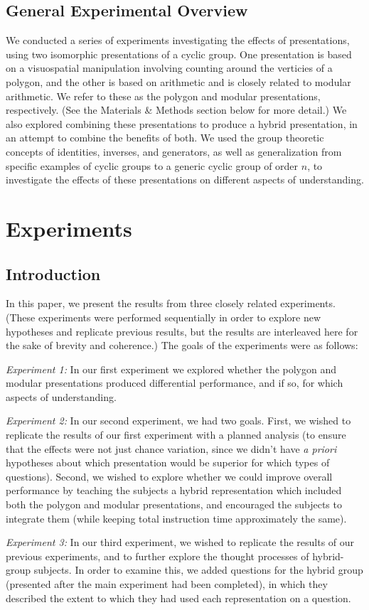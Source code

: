 \documentclass[man,10pt]{apa6}
\begin{document}
\subsection{General Experimental Overview}
We conducted a series of experiments investigating the effects of presentations, using two isomorphic presentations of a cyclic group. One presentation is based on a visuospatial manipulation involving counting around the verticies of a polygon, and the other is based on arithmetic and is closely related to modular arithmetic. We refer to these as the polygon and modular presentations, respectively. (See the Materials \& Methods section below for more detail.) We also explored combining these presentations to produce a hybrid presentation, in an attempt to combine the benefits of both. We used the group theoretic concepts of identities, inverses, and generators, as well as generalization from specific examples of cyclic groups to a generic cyclic group of order $n$, to investigate the effects of these presentations on different aspects of understanding. 
\section{Experiments}
\subsection{Introduction}
In this paper, we present the results from three closely related experiments. (These experiments were performed sequentially in order to explore new hypotheses and replicate previous results, but the results are interleaved here for the sake of brevity and coherence.) The goals of the experiments were as follows: \par
\textit{Experiment 1:} In our first experiment we explored whether the polygon and modular presentations produced differential performance, and if so, for which aspects of understanding. \par
\textit{Experiment 2:} In our second experiment, we had two goals. First, we wished to replicate the results of our first experiment with a planned analysis (to ensure that the effects were not just chance variation, since we didn't have \textit{a priori} hypotheses about which presentation would be superior for which types of questions). Second, we wished to explore whether we could improve overall performance by teaching the subjects a hybrid representation which included both the polygon and modular presentations, and encouraged the subjects to integrate them (while keeping total instruction time approximately the same). \par
\textit{Experiment 3:} In our third experiment, we wished to replicate the results of our previous experiments, and to further explore the thought processes of hybrid-group subjects. In order to examine this, we added questions for the hybrid group (presented after the main experiment had been completed), in which they described the extent to which they had used each representation on a question. 
\end{document}
